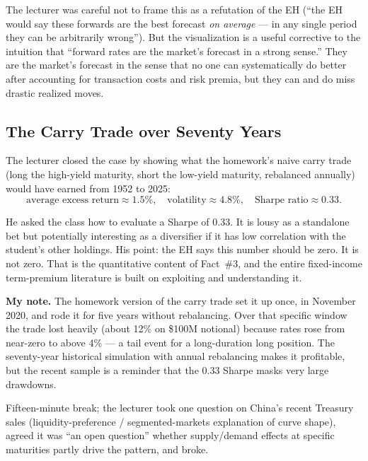 The lecturer was careful not to frame this as a refutation of the EH
(``the EH would say these forwards are the best forecast \emph{on average} ---
in any single period they can be arbitrarily wrong''). But the visualization
is a useful corrective to the intuition that ``forward rates are the market's
forecast in a strong sense.'' They are the market's forecast in the sense
that no one can systematically do better after accounting for transaction
costs and risk premia, but they can and do miss drastic realized moves.

\subsection{The Carry Trade over Seventy Years}\label{L2-sec:invyc-carry}

The lecturer closed the case by showing what the homework's naive carry trade
(long the high-yield maturity, short the low-yield maturity, rebalanced
annually) would have earned from 1952 to 2025:
\[
  \text{average excess return} \approx 1.5\%, \quad
  \text{volatility} \approx 4.8\%, \quad
  \text{Sharpe ratio} \approx 0.33.
\]

He asked the class how to evaluate a Sharpe of $0.33$. It is lousy as a
standalone bet but potentially interesting as a diversifier if it has low
correlation with the student's other holdings. His point: the EH says this
number should be zero. It is not zero. That is the quantitative content of
Fact~\#3, and the entire fixed-income term-premium literature is built on
exploiting and understanding it.

\begin{checkpoint}
\textbf{My note.} The homework version of the carry trade set it up once,
in November 2020, and rode it for five years without rebalancing. Over
that specific window the trade lost heavily (about 12\% on \$100M
notional) because rates rose from near-zero to above 4\% --- a tail event
for a long-duration long position. The seventy-year historical simulation
with annual rebalancing makes it profitable, but the recent sample is a
reminder that the $0.33$ Sharpe masks very large drawdowns.
\end{checkpoint}

Fifteen-minute break; the lecturer took one question on China's recent
Treasury sales (liquidity-preference / segmented-markets explanation of curve
shape), agreed it was ``an open question'' whether supply/demand effects at
specific maturities partly drive the pattern, and broke.

